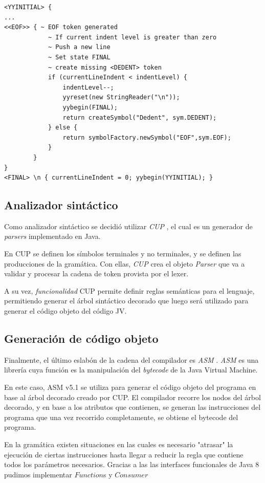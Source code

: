 \documentclass[spanish]{article}
\begin{document}
\clearpage
            \begin{lstlisting}
<YYINITIAL> {
...
<<EOF>> { ~ EOF token generated
            ~ If current indent level is greater than zero
            ~ Push a new line
            ~ Set state FINAL
            ~ create missing <DEDENT> token
			if (currentLineIndent < indentLevel) {
				indentLevel--;
				yyreset(new StringReader("\n"));
				yybegin(FINAL);
				return createSymbol("Dedent", sym.DEDENT);
			} else {
				return symbolFactory.newSymbol("EOF",sym.EOF);
			}
		}
}
<FINAL> \n { currentLineIndent = 0; yybegin(YYINITIAL); }
            \end{lstlisting}
        \subsection{Analizador sintáctico}
            \par Como analizador sintáctico se decidió utilizar \textit{CUP} \cite{cup_home}, el cual es un generador de \textit{parsers} implementado en Java. 
            \par En CUP se definen los símbolos terminales y no terminales, y se definen las producciones de la gramática. Con ellas, \textit{CUP} crea el objeto \textit{Parser} que va a validar y procesar la cadena de token provista por el lexer.
            \par A su vez, \textit{funcionalidad} CUP permite definir reglas semánticas para el lenguaje, permitiendo generar el árbol sintáctico decorado que luego será utilizado para generar el código objeto del código JV.

        \subsection{Generación de código objeto}
            \par Finalmente, el último eslabón de la cadena del compilador es \textit{ASM} \cite{asm_guide}. \textit{ASM} es una librería cuya función es la manipulación del \textit{bytecode} de la Java Virtual Machine.
            \par En este caso, ASM v5.1 \cite{asm_doc} se utiliza para generar el código objeto  del programa en base al árbol decorado creado por CUP. El compilador recorre los nodos del árbol decorado, y en base a los atributos que contienen, se generan las instrucciones del programa que una vez recorrido completamente, se obtiene el bytecode del programa.
            \par En la gramática existen situaciones en las cuales es necesario "atrasar" la ejecución de ciertas instrucciones hasta llegar a reducir la regla que contiene todos los parámetros necesarios. Gracias a las las interfaces funcionales de Java 8 \cite{j8_functional} pudimos implementar $Function$s y $Consumer$
        \clearpage
\end{document}
